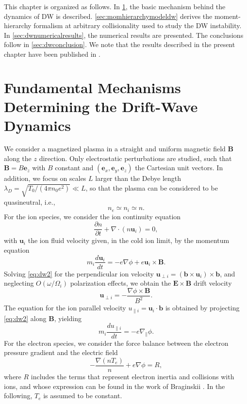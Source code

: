 This chapter is organized as follows.
%
In \cref{sec:dwmechanism}, the basic mechanism behind the dynamics of DW is described.
%
\cref{sec:momhierarchymodeldw} derives the moment-hierarchy formalism at arbitrary collisionality used to study the DW instability.
%
In \cref{sec:dwnumericalresults}, the numerical results are presented.
%
The conclusions follow in \cref{sec:dwconclusion}.
%
We note that the results described in the present chapter have been published in \citep{Jorge2018}.

\section{Fundamental Mechanisms Determining the Drift-Wave Dynamics}
\label{sec:dwmechanism}

We consider a magnetized plasma in a straight and uniform magnetic field $\mathbf B$ along the $z$ direction.
%
Only electrostatic perturbations are studied, such that $\mathbf B = B \mathbf e_z$ with $B$ constant and $(\mathbf e_x, \mathbf e_y, \mathbf e_z)$ the Cartesian unit vectors.
%
In addition, we focus on scales $L$ larger than the Debye length $\lambda_D=\sqrt{T_0/(4\pi n_0 e^2)}\ll L$, so that the plasma can be considered to be quasineutral, i.e., 
%
\begin{equation}
    n_e \simeq n_i \simeq n.
\end{equation}
%
For the ion species, we consider the ion continuity equation
%
\begin{equation}
    \frac{\partial n}{\partial t}+\nabla \cdot( n \mathbf u_i) =0,
\label{eq:dw1}
\end{equation}
%
with $\mathbf u_i$ the ion fluid velocity given, in the cold ion limit, by the momentum equation
%
\begin{equation}
    m_i \frac{d \mathbf u_i}{dt}=-e \nabla \phi + e \mathbf u_i \times \mathbf B.
\label{eq:dw2}
\end{equation}
%
Solving \cref{eq:dw2} for the perpendicular ion velocity $\mathbf u_{\perp i}=( \mathbf b \times \mathbf u_i)\times \mathbf b$, and neglecting $O({\omega}/{\Omega_i})$ polarization effects, we obtain the $\mathbf E \times \mathbf B$ drift velocity
%
\begin{equation}
    \mathbf u_{\perp i} = -\frac{\nabla \phi \times \mathbf B}{B^2}.
\label{eq:dw3}
\end{equation}
%
The equation for the ion parallel velocity $u_{\parallel i} = \mathbf u_i \cdot \mathbf b$ is obtained by projecting \cref{eq:dw2} along $\mathbf B$, yielding
%
\begin{equation}
    m_i \frac{d u_{\parallel i}}{dt} = -e \nabla_\parallel \phi.
\label{eq:dw4}
\end{equation}
%
For the electron species, we consider the force balance between the electron pressure gradient and the electric field
%
\begin{equation}
    - \frac{\nabla (n T_e)}{n}+e \nabla \phi = R,
\label{eq:dw5}
\end{equation}
%
where $R$ includes the terms that represent electron inertia and collisions with ions, and whose expression can be found in the work of Braginskii \citep{Braginskii1965}.
%
In the following, $T_e$ is assumed to be constant.

